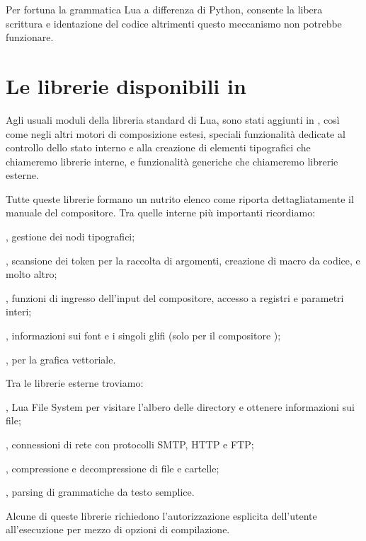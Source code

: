 Per fortuna la grammatica Lua a differenza di Python, consente la libera
scrittura e identazione del codice altrimenti questo meccanismo non potrebbe
funzionare.


\section{Le librerie disponibili in \LuaTeX}

Agli usuali moduli della libreria standard di Lua, sono stati aggiunti in
\LuaTeX{}, così come negli altri motori di composizione estesi, speciali
funzionalità dedicate al controllo dello stato interno e alla creazione di
elementi tipografici che chiameremo librerie interne, e funzionalità generiche
che chiameremo librerie esterne.

Tutte queste librerie formano un nutrito elenco come riporta dettagliatamente il
manuale del compositore. Tra quelle interne più importanti ricordiamo:
\begin{compactitemize}
\item {}, gestione dei nodi tipografici;
\item {}, scansione dei token per la raccolta di argomenti, creazione
di macro da codice, e molto altro;
\item {}, funzioni di ingresso dell'input del compositore, accesso a
registri e parametri interi;
\item {}, informazioni sui font e i singoli glifi (solo per il
compositore );
\item {},  per la grafica vettoriale.
\end{compactitemize}

Tra le librerie esterne troviamo:
\begin{compactitemize}
\item {}, Lua File System per visitare l'albero delle directory e
ottenere informazioni sui file;
\item {}, connessioni di rete con protocolli SMTP, HTTP e FTP;
\item {}, compressione e decompressione di file e cartelle;
\item {}, parsing di grammatiche da testo semplice.
\end{compactitemize}

Alcune di queste librerie richiedono l'autorizzazione esplicita dell'utente
all'esecuzione per mezzo di opzioni di compilazione.


